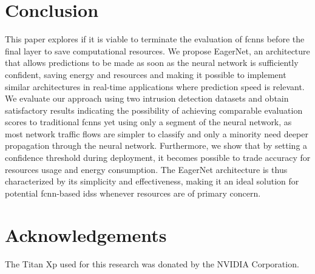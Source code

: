 \documentclass[conference]{IEEEtran}
\begin{document}
\section{Conclusion}

This paper explores if it is viable to terminate the evaluation of \glspl{fcnn} before the final layer to save computational resources. We propose EagerNet, an architecture that allows predictions to be made as soon as the neural network is sufficiently confident, saving energy and resources and making it possible to implement similar architectures in real-time applications where prediction speed is relevant. We evaluate our approach using two intrusion detection datasets and obtain satisfactory results indicating the possibility of achieving comparable evaluation scores to traditional \glspl{fcnn} yet using only a segment of the neural network, as most network traffic flows are simpler to classify and only a minority need deeper propagation through the neural network.
Furthermore, we show that by setting a confidence threshold during deployment, it becomes possible to trade accuracy for resources usage and energy consumption. The EagerNet architecture is thus characterized by its simplicity and effectiveness, making it an ideal solution for potential \gls{fcnn}-based \glspl{ids} whenever resources are of primary concern.

\section*{Acknowledgements}
The Titan Xp used for this research was donated by the NVIDIA Corporation.



\end{document}
